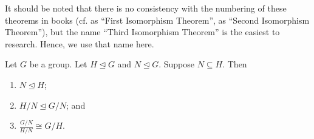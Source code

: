 It should be noted that there is no consistency with the numbering of these theorems in books (cf. {\cite[\S 68]{clark_1984}} as ``First Isomorphism Theorem'', {\cite[Theorem 8.16]{humphreys_1996}} as ``Second Isomorphism Theorem''), but the name ``Third Isomorphism Theorem'' is the easiest to research. Hence, we use that name here.

\begin{theorem}\label{thrm-isomorphism-3}
    Let $G$ be a group. Let $H \unlhd G$ and $N \unlhd G$. Suppose $N \subseteq H$. Then
    \begin{enumerate}
        \item $N \unlhd H$;
        \item $H/N \unlhd G/N$; and
        \item $\frac{G/N}{H/N} \cong G/H$.
    \end{enumerate}
\end{theorem}
